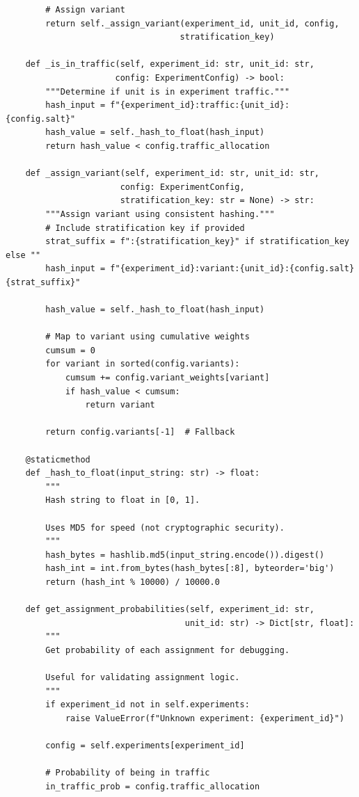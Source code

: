 \begin{lstlisting}
        # Assign variant
        return self._assign_variant(experiment_id, unit_id, config,
                                   stratification_key)

    def _is_in_traffic(self, experiment_id: str, unit_id: str,
                      config: ExperimentConfig) -> bool:
        """Determine if unit is in experiment traffic."""
        hash_input = f"{experiment_id}:traffic:{unit_id}:{config.salt}"
        hash_value = self._hash_to_float(hash_input)
        return hash_value < config.traffic_allocation

    def _assign_variant(self, experiment_id: str, unit_id: str,
                       config: ExperimentConfig,
                       stratification_key: str = None) -> str:
        """Assign variant using consistent hashing."""
        # Include stratification key if provided
        strat_suffix = f":{stratification_key}" if stratification_key else ""
        hash_input = f"{experiment_id}:variant:{unit_id}:{config.salt}{strat_suffix}"

        hash_value = self._hash_to_float(hash_input)

        # Map to variant using cumulative weights
        cumsum = 0
        for variant in sorted(config.variants):
            cumsum += config.variant_weights[variant]
            if hash_value < cumsum:
                return variant

        return config.variants[-1]  # Fallback

    @staticmethod
    def _hash_to_float(input_string: str) -> float:
        """
        Hash string to float in [0, 1].

        Uses MD5 for speed (not cryptographic security).
        """
        hash_bytes = hashlib.md5(input_string.encode()).digest()
        hash_int = int.from_bytes(hash_bytes[:8], byteorder='big')
        return (hash_int % 10000) / 10000.0

    def get_assignment_probabilities(self, experiment_id: str,
                                    unit_id: str) -> Dict[str, float]:
        """
        Get probability of each assignment for debugging.

        Useful for validating assignment logic.
        """
        if experiment_id not in self.experiments:
            raise ValueError(f"Unknown experiment: {experiment_id}")

        config = self.experiments[experiment_id]

        # Probability of being in traffic
        in_traffic_prob = config.traffic_allocation


\end{lstlisting}
